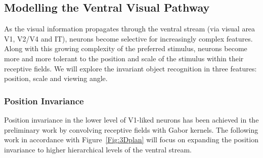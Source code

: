 \documentclass[journal]{journal}
\begin{document}





\subsection{Modelling the Ventral Visual Pathway}
As the visual information propagates through the ventral stream (via visual area V1, V2/V4 and IT), neurons become selective for increasingly complex features. 
Along with this growing complexity of the preferred stimulus, neurons become more and more tolerant to the position and scale of the stimulus within their receptive fields.
We will explore the invariant object recognition in three features: position, scale and viewing angle.
\subsubsection{Position Invariance}
Position invariance in the lower level of V1-liked neurons has been achieved in the preliminary work by convolving receptive fields with Gabor kernels.
The following work in accordance with Figure~\ref{Fig:3Dplan} will focus on expanding the position invariance to higher hierarchical levels of the ventral stream.
\end{document}
